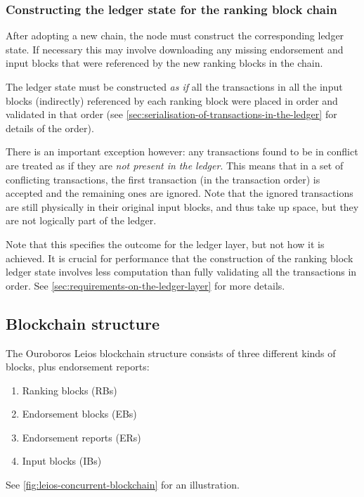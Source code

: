 \documentclass[11pt,a4paper]{article}
\begin{document}
\subsubsection{Constructing the ledger state for the ranking block chain}
After adopting a new chain, the node must construct the corresponding ledger
state. If necessary this may involve downloading any missing endorsement and
input blocks that were referenced by the new ranking blocks in the chain.

The ledger state must be constructed \emph{as if} all the transactions in all
the input blocks (indirectly) referenced by each ranking block were placed in
order and validated in that order (see
\cref{sec:serialisation-of-transactions-in-the-ledger} for details of the
order).

There is an important exception however: any transactions found to be in
conflict are treated as if they are \emph{not present in the ledger}. This
means that in a set of conflicting transactions, the first transaction (in the
transaction order) is accepted and the remaining ones are ignored. Note that
the ignored transactions are still physically in their original input blocks,
and thus take up space, but they are not logically part of the ledger.

Note that this specifies the outcome for the ledger layer, but not how it is
achieved. It is crucial for performance that the construction of the ranking
block ledger state involves less computation than fully validating all the
transactions in order. See \cref{sec:requirements-on-the-ledger-layer} for more
details.

\subsection{Blockchain structure}
\label{sec:blockchain-structure}

The Ouroboros Leios blockchain structure consists of three different kinds of
blocks, plus endorsement reports:
\begin{enumerate}
\item Ranking blocks (RBs)
\item Endorsement blocks (EBs)
\item Endorsement reports (ERs)
\item Input blocks (IBs)
\end{enumerate}
See \cref{fig:leios-concurrent-blockchain} for an illustration.
\end{document}
